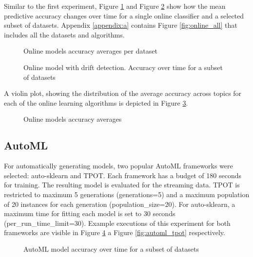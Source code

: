 \documentclass{sig-alternate-br}
\begin{document}
Similar to the first experiment, Figure \ref{fig:online_ht} and Figure \ref{fig:online_hat} show how the mean predictive accuracy changes over time for a single online classifier and a selected subset of datasets. Appendix \ref{appendix:a} contains Figure \ref{fig:online_all} that includes all the datasets and algorithms.

\begin{figure}[h]
\centering 
{}
\caption{Online models accuracy averages per dataset}
\label{fig:online_ht}
\end{figure}

\begin{figure}[h!]
\centering 
{}
\caption{Online model with drift detection. Accuracy over time for a subset of datasets}
\label{fig:online_hat}
\end{figure}

A violin plot, showing the distribution of the average accuracy across topics for each of the online learning algorithms is depicted in Figure \ref{fig:online_violin}.

\begin{figure}[h]
\centering 
{}
\caption{Online models accuracy averages}
\label{fig:online_violin}
\end{figure}

\subsection{AutoML}

For automatically generating models, two popular \cite{gijsbers2019open} AutoML frameworks were selected: auto-sklearn and TPOT. Each framework has a budget of 180 seconds for training. The resulting model is evaluated for the streaming data. TPOT is restricted to maximum 5 generations (generations=5) and a maximum population of 20 instances for each generation (population\_size=20). For auto-sklearn, a maximum time for fitting each model is set to 30 seconds (per\_run\_time\_limit=30). Example executions of this experiment for both frameworks are visible in Figure \ref{fig:automl_ask} a Figure \ref{fig:automl_tpot} respectively.

\begin{figure}[h]
\centering 
{}
\caption{AutoML model accuracy over time for a subset of datasets}
\label{fig:automl_ask}
\end{figure}
\end{document}

